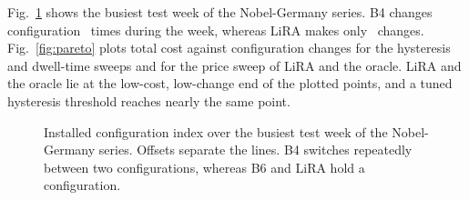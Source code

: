 \documentclass[journal]{IEEEtran}
\begin{document}
\begin{table}[t]
\centering
\caption{All Topologies and Scenarios: Configuration Changes per Day, Total Cost $J$, and Holm-Adjusted $p$-Values of the Wilcoxon Test on Per-Day Cost (B4, B6, and LiRA: Mean over Five Seeds)}
\label{tab:scen}
\footnotesize
\setlength{\tabcolsep}{3.5pt}

\end{table}

Fig.~\ref{fig:case} shows the busiest test week of the Nobel-Germany series. B4 changes configuration \caseBFourchg\ times during the week, whereas LiRA makes only \caseLiRAchg\ changes. Fig.~\ref{fig:pareto} plots total cost against configuration changes for the hysteresis and dwell-time sweeps and for the price sweep of LiRA and the oracle. LiRA and the oracle lie at the low-cost, low-change end of the plotted points, and a tuned hysteresis threshold reaches nearly the same point.

\begin{figure}[t]
\centering
{}
\caption{Installed configuration index over the busiest test week of the Nobel-Germany series. Offsets separate the lines. B4 switches repeatedly between two configurations, whereas B6 and LiRA hold a configuration.}
\label{fig:case}
\end{figure}
\end{document}
